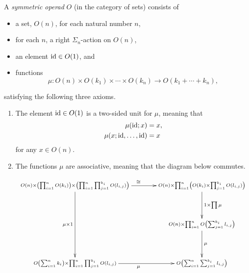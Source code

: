 \begin{Defi}\label{Defi:sym-op}
A \textit{symmetric operad} $O$ (in the category of sets) consists of
\begin{itemize}
\item a set, $O(n)$, for each natural number $n$,
\item for each $n$, a right $\Sigma_{n}$-action on $O(n)$,
\item an element $\textrm{id} \in O(1)$, and
\item functions
  \[
    \mu \colon  O(n) \times O(k_{1}) \times \cdots \times O(k_{n}) \rightarrow O(k_{1} + \cdots + k_{n}),
  \]
\end{itemize}
satisfying the following three axioms.
\begin{enumerate}
\item The element $\textrm{id} \in O(1)$ is a two-sided unit for $\mu$, meaning that
  \begin{align*}
    \mu(\textrm{id};x) &= x,\\
    \mu(x;\textrm{id},\ldots,\textrm{id}) &= x
  \end{align*}
for any $x \in O(n)$.
\item The functions $\mu$ are associative, meaning that the diagram below commutes.


  \[
    \xy
      (0,0)*+{\scriptstyle O(n) \times \left(\prod_{i=1}^n O(k_i)\right) \times \left(\prod_{i=1}^n\prod_{j=1}^{k_i} O(l_{i,j})\right)}="a";
      (65,0)*+{\scriptstyle O(n) \times \prod_{i=1}^n \left(O(k_i) \times \prod_{j=1}^{k_i} O(l_{i,j})\right)}="b";
      (65,-20)*+{\scriptstyle O(n) \times \prod_{i=1}^n O\left(\sum_{j=1}^{k_i} l_{i,j}\right)}="c";
      (65,-40)*+{\scriptstyle O\left(\sum_{i=1}^n \sum_{j=1}^{k_i} l_{i,j}\right)}="d";
      (0,-40)*+{\scriptstyle O\left(\sum_{i=1}^n k_i\right) \times \prod_{i=1}^n \prod_{j=1}^{k_i} O(l_{i,j})}="e";
      {\ar^{\cong} "a" ; "b"};
      {\ar^{1 \times \prod \mu} "b" ; "c"};
      {\ar^{\mu} "c" ; "d"};
      {\ar_{\mu \times 1} "a" ; "e"};
      {\ar_{\mu} "e" ; "d"};
    \endxy
  \]


\end{enumerate}
\end{Defi}
